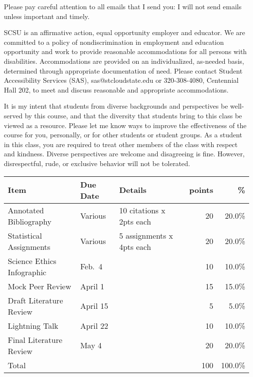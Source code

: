 \documentclass{tufte-handout}
\begin{document}
\begin{fullwidth}

\color{blue}
Please pay careful attention to all emails that I send you: I will not send emails unless important and timely. 
\color{black}


 SCSU is an affirmative action, equal opportunity employer and educator. We are committed to a policy of nondiscrimination in employment and education opportunity and work to provide reasonable accommodations for all persons with disabilities. Accommodations are provided on an individualized, as-needed basis, determined through appropriate documentation of need. Please contact Student Accessibility Services (SAS), sas@stcloudstate.edu or 320-308-4080, Centennial Hall 202, to meet and discuss reasonable and appropriate accommodations. 

 It is my intent that students from diverse backgrounds and perspectives be well-served by this course, and that the diversity that students bring to this class be viewed as a resource. Please let me know ways to improve the effectiveness of the course for you, personally, or for other students or student groups. As a student in this class, you are required to treat other members of the class with respect and kindness. Diverse perspectives are welcome and disagreeing is fine. However, disrespectful, rude, or exclusive behavior will not be tolerated.


\end{fullwidth}


\begin{fullwidth}



\begin{table}
\begin{tabular}{l l l r r}
Item & Due Date & Details & points & \% \\
\hline
Annotated Bibliography & Various & 10 citations x 2pts each & 20 & 20.0\% \\
Statistical Assignments & Various & 5 assignments x 4pts each & 20 & 20.0\% \\	
Science Ethics Infographic & Feb.~4 &  & 10 & 10.0\% \\
Mock Peer Review & April 1 & & 15 & 15.0\% \\
Draft Literature Review &  April 15 &  & 5 & 5.0\% \\
Lightning Talk & April 22 &  & 10 & 10.0\% \\
Final Literature Review & May 4 &  & 20 & 20.0\% \\
\hline
Total & & & 100 & 100.0\% 
\end{tabular}
\end{table}

\end{fullwidth}
\end{document}

